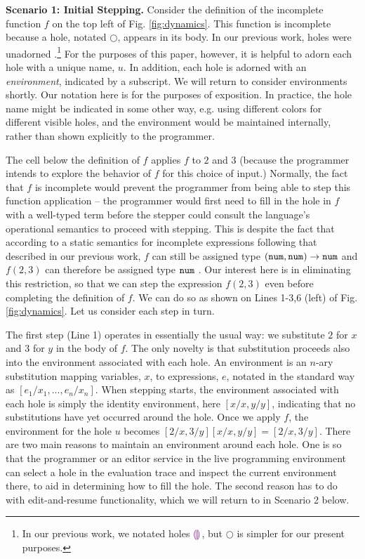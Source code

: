 \noindent\textbf{Scenario 1: Initial Stepping.} Consider the definition of the incomplete function $f$ on the top left of Fig. \ref{fig:dynamics}. 
%
This function is incomplete because a hole, notated $\Circle$, appears in its body. In our previous work, holes were unadorned \cite{popl-paper}.\footnote{In our previous work, we notated holes $\textcolor{violet}{\llparenthesis}\textcolor{violet}{\rrparenthesis}$, but $\Circle$ is simpler for our present purposes.} For the purposes of this paper, however, it is helpful to adorn each hole with a unique name, $u$. In addition, each hole is adorned with an \emph{environment}, indicated by a subscript. We will return to consider environments shortly. Our notation here is for the purposes of exposition. In practice, the hole name might be indicated in some other way, e.g. using different colors for different visible holes, and the environment would be maintained internally, rather than shown explicitly to the programmer.

The cell below the definition of $f$ applies $f$ to $2$ and $3$ (because the programmer intends to explore the behavior of $f$ for this choice of input.) Normally, the fact that $f$ is incomplete would prevent the programmer from being able to step this function application -- the programmer would first need to fill in the hole in $f$ with a well-typed term before the stepper could consult the language's operational semantics to proceed with stepping. This is despite the fact that according to a static semantics for incomplete expressions following that described in our previous work, $f$ can still be assigned type $(\texttt{num}, \texttt{num}) \rightarrow \texttt{num}$ and $f(2, 3)$ can therefore be assigned type $\texttt{num}$ \cite{popl-paper}. Our interest here is in eliminating this restriction, so that we can step the expression $f(2, 3)$ even before completing the definition of $f$. We can do so as shown on Lines 1-3,6 (left) of Fig. \ref{fig:dynamics}.  Let us consider each step in turn. 

The first step (Line 1) operates in essentially the usual way: 
we substitute $2$ for $x$ and $3$ for $y$ in the body of $f$. The only novelty is that substitution proceeds also into the {environment associated with each hole}. An environment is an $n$-ary substitution mapping variables, $x$, to expressions, $e$, notated in the standard way as $[e_1/x_1, ..., e_n/x_n]$. When stepping starts, the environment associated with each hole is simply the identity environment, here $[x/x, y/y]$, indicating that no substitutions have yet occurred around the hole. Once we apply $f$, the environment for the hole $u$ becomes $[2/x, 3/y][x/x, y/y] = [2/x, 3/y]$. There are two main reasons to maintain an environment around each hole. One is so that the programmer or an editor service in the live programming environment can select a hole in the evaluation trace and inspect the current environment there, to aid in determining how to fill the hole. The second reason has to do with edit-and-resume functionality, which we will return to in Scenario 2 below.

